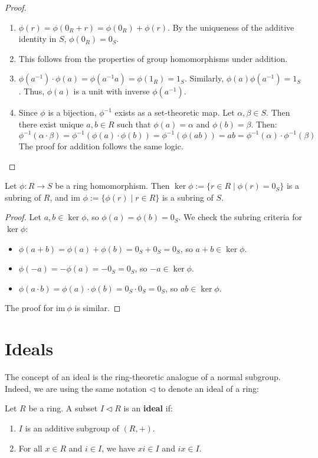 \begin{proof}
\begin{enumerate}
    \item $\phi(r) = \phi(0_R + r) = \phi(0_R) + \phi(r)$. By the uniqueness of the additive identity in $S$, $\phi(0_R) = 0_S$.
    \item This follows from the properties of group homomorphisms under addition.
    \item $\phi(a^{-1}) \cdot \phi(a) = \phi(a^{-1} a) = \phi(1_R) = 1_S$. Similarly, $\phi(a) \phi(a^{-1}) = 1_S$. Thus, $\phi(a)$ is a unit with inverse $\phi(a^{-1})$.
    \item Since $\phi$ is a bijection, $\phi^{-1}$ exists as a set-theoretic map. Let $\alpha, \beta \in S$. Then there exist unique $a, b \in R$ such that $\phi(a) = \alpha$ and $\phi(b) = \beta$. Then:
    \[ \phi^{-1}(\alpha \cdot \beta) = \phi^{-1}(\phi(a) \cdot \phi(b)) = \phi^{-1}(\phi(ab)) = ab = \phi^{-1}(\alpha) \cdot \phi^{-1}(\beta) \]
    The proof for addition follows the same logic.
\end{enumerate}
\end{proof}

\begin{proposition}
Let $\phi: R \to S$ be a ring homomorphism. Then $\ker \phi := \{ r \in R \mid \phi(r) = 0_S \}$ is a subring of $R$, and $\text{im } \phi := \{ \phi(r) \mid r \in R \}$ is a subring of $S$.
\end{proposition}

\begin{proof}
Let $a, b \in \ker \phi$, so $\phi(a) = \phi(b) = 0_S$. We check the subring criteria for $\ker \phi$:
\begin{itemize}
    \item $\phi(a+b) = \phi(a) + \phi(b) = 0_S + 0_S = 0_S$, so $a+b \in \ker \phi$.
    \item $\phi(-a) = -\phi(a) = -0_S = 0_S$, so $-a \in \ker \phi$.
    \item $\phi(a \cdot b) = \phi(a) \cdot \phi(b) = 0_S \cdot 0_S = 0_S$, so $ab \in \ker \phi$.
\end{itemize}
The proof for $\mathrm{im }\ \phi$ is similar.
\end{proof}


\section{Ideals}
The concept of an ideal is the ring-theoretic analogue of a normal subgroup. Indeed, we are using the same notation $\lhd$ to denote an ideal of a ring:
\begin{definition}[Ideal]
Let $R$ be a ring. A subset $I \lhd R$ is an \textbf{ideal} if:
\begin{enumerate}
    \item $I$ is an additive subgroup of $(R, +)$.
    \item For all $x \in R$ and $i \in I$, we have $xi \in I$ and $ix \in I$.
\end{enumerate}
\end{definition}

